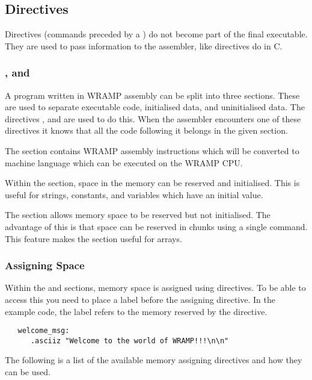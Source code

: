 \subsection{Directives}
Directives (commands preceded by a ) do not become part of the
final executable. They are used to pass information to the assembler,
like \src{\#} directives do in C.

\subsubsection{\text, \data and \bss}
A program written in WRAMP assembly can be split into three sections.
These are used to separate executable code, initialised data, and
uninitialised data. The directives \text, \data and \bss are used to
do this. When the assembler encounters one of these directives it
knows that all the code following it belongs in the given section.

The \text section contains WRAMP assembly instructions which will be
converted to machine language which can be executed on the WRAMP CPU.

Within the \data section, space in the memory can be reserved and
initialised. This is useful for strings, constants, and variables
which have an initial value.

The \bss section allows memory space to be reserved but not initialised.
The advantage of this is that space can be reserved in chunks using a single
command. This feature makes the \bss section useful for arrays.

\subsubsection{Assigning Space}
Within the \data and \bss sections, memory space is assigned using directives. 
To be able to access this you need to place a label before the assigning
directive. In the example code, the label  refers to the
memory reserved by the \asciiz directive.

\begin{verbatim}
   welcome_msg:
      .asciiz "Welcome to the world of WRAMP!!!\n\n"
\end{verbatim}

The following is a list of the available memory assigning directives
and how they can be used.

